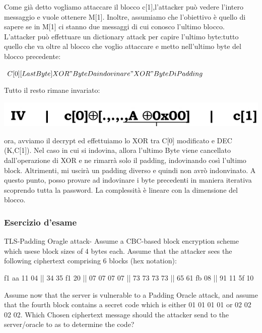 \documentclass{book}
\theoremstyle{remark}
\begin{document}
Come già detto vogliamo attaccare il blocco c[1],l'attacker può vedere l'intero messaggio e vuole ottenere M[1]\@. Inoltre, assumiamo che l'obiettivo è quello di sapere se in M[1] ci stanno due messaggi di cui conosco l'ultimo blocco\@. L'attacker può effettuare un dictionary attack per capire l'ultimo byte:\@taglio tutto quello che va oltre al blocco che voglio attaccare e metto nell'ultimo byte del blocco precedente:\begin{center}
	\(C[0][LastByte]XOR"ByteDaindovinare"XOR"ByteDiPadding\)
\end{center}
Tutto il resto rimane invariato:\begin{center}
	\includegraphics[scale=0.5]{STARTFROM.png}
\end{center}
ora, avviamo il decrypt ed effettuiamo lo XOR tra C[0] modificato e DEC (K,C[1])\@. Nel caso in cui si indovina, allora l'ultimo Byte viene cancellato dall'operazione di XOR e ne rimarrà solo il padding, indovinando così l'ultimo block\@. Altrimenti, mi uscirà un padding diverso e quindi non avrò indonvinato\@. A questo punto, posso provare ad indovinare i byte precedenti in maniera iterativa scoprendo tutta la password\@. La complessità è lineare con la dimensione del blocco\@.
\subsubsection{Esercizio d'esame}
TLS-Padding Oragle attack- Assume a CBC-based block encryption scheme which usese block sizes of 4 bytes each\@. Assume that the attacker sees the following ciphertext comprising 6 blocks (hex notation):\@\begin{center}
	f1 aa 11 04 || 34 35 f1 20 || 07 07 07 07 || 73 73 73 73 || 65 61 fb 08 || 91 11 5f 10
\end{center}
Assume now that the server is vulnerable to a Padding Oracle attack, and assume that the fourth block contains a secret code which is either 01 01 01 01 or 02 02 02 02\@. Which Chosen ciphertext message should the attacker send to the server/oracle to as to determine the code?\newline
\end{document}
